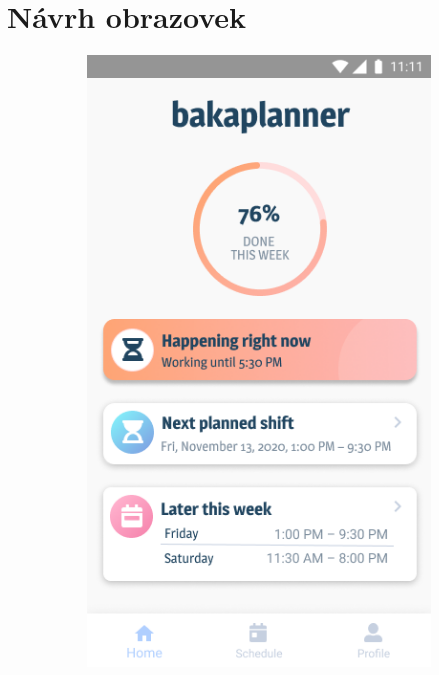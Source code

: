 \documentclass[twoside]{ctuthesis}
\begin{document}
\newpage
\section{Návrh obrazovek}
\begin{figure}[h]
	\centering
	\begin{subfigure}{.5\textwidth}
		\centering
		\includegraphics[width=.9\linewidth]{img/v1-main-home.png}
		\label{fig:main-home}
	\end{subfigure}%
	\begin{subfigure}[h!]{.5\textwidth}
		\centering

\end{subfigure}
\end{figure}
\end{document}
